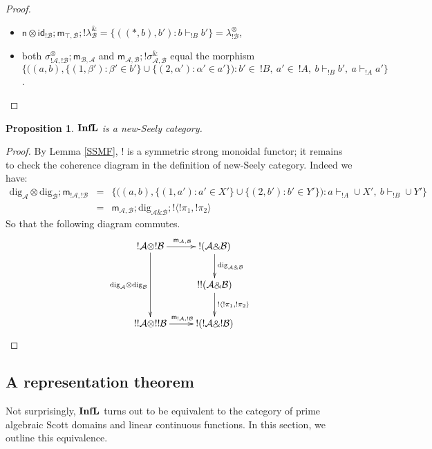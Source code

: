 \documentclass[copyright,creativecommons]{eptcs}
\newtheorem{proposition}[theorem]{Proposition}
\newcommand{\cA}{\mathcal{A}}
\newcommand{\cB}{\mathcal{B}}
\newcommand{\ga}{\alpha}
\newcommand{\gb}{\beta}
\newcommand{\dig}{\mathrm{dig}}
\begin{document}
\begin{proof}
\begin{itemize}
\item $\textsf{n} \otimes \textsf{id}_{! \cB} ; \textsf{m}_{\top, \cB} ; !\lambda_\cB^\binampersand = \{((\ast, b),b') : b \vdash_{! B} b'\} = \lambda_{!\cB}^\otimes$,

\item both $\sigma_{!\cA,!\cB}^\otimes;\textsf{m}_{\cB,\cA}$ and $\textsf{m}_{\cA,\cB}; !\sigma_{\cA,\cB}^\binampersand$ equal the morphism \\ 
$\big\{\big( (a,b), \{(1,\gb') : \gb' \in b' \} \cup \{(2,\ga') : \ga' \in a' \} \big) : b' \in \ ! B,\ a' \in \ ! A,\ b \vdash_{! B} b',\ a \vdash_{! A} a' \big\}$.
\end{itemize}
\end{proof}


\begin{proposition}
$\mathbf{InfL}$ is a new-Seely category.
\end{proposition}

\begin{proof}
By Lemma \ref{SSMF}, $!$ is a symmetric strong monoidal functor; it remains to check the coherence diagram in the definition of new-Seely category. Indeed we have: 
\begin{eqnarray*}
\dig_\cA \otimes \dig_\cB ;  \textsf{m}_{! \cA,! \cB} & = & \big\{\big(  (a,b) ,  \{(1,a') : a' \in X'\} \cup \{(2,b') : b' \in Y'\} \big) : a \vdash_{! A} \cup X',\ b \vdash_{! B} \cup Y' \big\} \\
 & = & \textsf{m}_{\cA,\cB} ; \dig_{\cA \binampersand \cB}; ! \langle ! \pi_1, ! \pi_2 \rangle
\end{eqnarray*}
So that the following diagram commutes.
$$
\xymatrix{
! \cA \otimes ! \cB \ar[r]^{\textsf{m}_{\cA, \cB}} \ar[dd]_{\dig_\cA \otimes \dig_\cB} & ! (\cA \binampersand \cB) \ar[d]^{\dig_{\cA \binampersand \cB}} \\
 & !! (\cA \binampersand \cB) \ar[d]^{! \langle ! \pi_1, ! \pi_2 \rangle} \\
!! \cA \otimes !! \cB \ar[r]^{\textsf{m}_{!\cA, !\cB}} & ! (! \cA \binampersand !\cB)
}
$$
\end{proof}



\subsection{A representation theorem}

Not surprisingly, $\mathbf{InfL}$ turns out to be equivalent to the category of prime algebraic 
Scott domains and linear continuous functions. In this section, we outline this equivalence.
\end{document}
